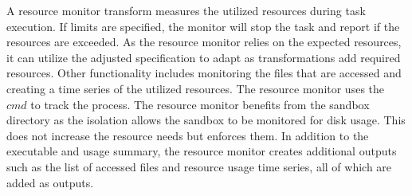\documentclass[conference]{IEEEtran}
\begin{document}
A resource monitor transform measures the utilized resources 
during task execution. 
If limits are specified, 
the monitor will stop the task and 
report if the resources are exceeded. 
As the resource monitor relies on the 
expected resources, it can utilize the 
adjusted specification to adapt
as transformations add required resources.
Other functionality includes 
monitoring the files that are accessed and 
creating a time series of the
utilized resources.
The resource monitor uses the $cmd$ 
to track the process. 
The resource monitor benefits from the 
sandbox directory as the isolation allows 
the sandbox to be monitored for disk usage.
This does not increase the resource needs
but enforces them.
In addition to the executable and usage summary, 
the resource monitor creates additional outputs
such as the list of accessed files and 
resource usage time series, all of which
are added as outputs.
\end{document}
